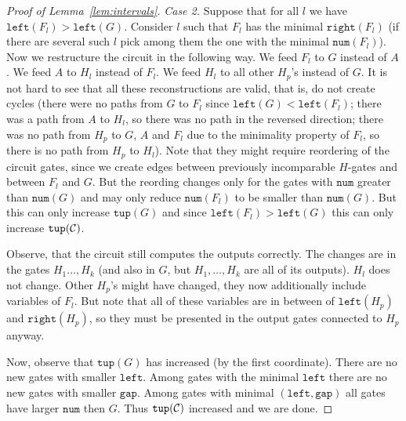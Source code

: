 \documentclass[11pt,letterpaper]{article}
\newcommand{\lef}{\texttt{left}}
\newcommand{\righ}{\texttt{right}}
\newcommand{\gap}{\texttt{gap}}
\newcommand{\num}{\texttt{num}}
\newcommand{\tup}{\texttt{tup}}
\begin{document}
\begin{proof}[Proof of Lemma~\ref{lem:intervals}]
\emph{Case 2.} Suppose that for all $l$ we have $\lef(F_l)>\lef(G)$. Consider $l$ such that $F_l$ has the minimal $\righ(F_l)$ (if there are several such $l$ pick among them the one with the minimal $\num(F_l)$). Now we restructure the circuit in the following way. We feed $F_l$ to $G$ instead of $A$. We feed $A$ to $H_l$ instead of $F_l$. We feed $H_l$ to all other $H_p$'s instead of $G$. It is not hard to see that all these reconstructions are valid, that is, do not create cycles (there were no paths from $G$ to $F_l$ since $\lef(G)<\lef(F_l)$; there was a path from $A$ to $H_l$, so there was no path in the reversed direction; there was no path from $H_p$ to $G$, $A$ and $F_l$ due to the minimality property of $F_l$, so there is no path from $H_p$ to $H_l$). Note that they might require reordering of the circuit gates, since we create edges between previously incomparable $H$-gates and between $F_l$ and $G$. But the reording changes only for the gates with $\num$ greater than $\num(G)$ and may only reduce $\num(F_l)$ to be smaller than $\num(G)$. But this can only increase $\tup(G)$ and since $\lef(F_l)>\lef(G)$ this can only increase $\tup({\cal C})$.

Observe, that the circuit still computes the outputs correctly. The changes are in the gates $H_1\ldots, H_k$ (and also in $G$, but $H_1,\ldots, H_k$ are all of its outputs). $H_l$ does not change. Other $H_p$'s might have changed, they now additionally include variables of $F_l$. But note that all of these variables are in between of $\lef(H_p)$ and $\righ(H_p)$, so they must be presented in the output gates connected to $H_p$ anyway.

Now, observe that $\tup(G)$ has increased (by the first coordinate). There are no new gates with smaller $\lef$. Among gates with the minimal $\lef$ there are no new gates with smaller $\gap$. Among gates with minimal $(\lef,\gap)$ all gates have larger $\num$ then $G$. Thus $\tup({\cal C})$ increased and we are done.
\end{proof}






\appendix
\end{document}
